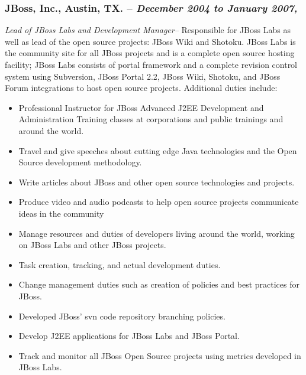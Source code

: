 \documentclass[10pt]{report}
\begin{document}
\subsubsection*{JBoss, Inc., Austin, TX. -- \emph{December 2004 to January 2007,
}} \emph{Lead of JBoss Labs and Development Manager--} Responsible for JBoss
Labs as well as lead of the open source projects: JBoss Wiki and Shotoku.  JBoss
Labs is the community site for all JBoss projects and is a complete open source
hosting facility;  JBoss Labs consists of portal framework and a complete
revision control system using Subversion, JBoss Portal 2.2, JBoss Wiki, Shotoku,
and JBoss Forum integrations to host open source projects.  Additional duties
include:

\begin{itemize}

	\item Professional Instructor for JBoss Advanced J2EE Development and
	Administration Training classes at corporations and public trainings and
	around the world.

	\item Travel and give speeches about cutting edge Java technologies and the
	Open Source development methodology.

	\item Write articles about JBoss and other open source technologies and
	projects.

	\item Produce video and audio podcasts to help open source projects
	communicate ideas in the community

	\item Manage resources and duties of developers living around the world,
	working on JBoss Labs and other JBoss projects.

	\item Task creation, tracking, and actual development duties.

	\item Change management duties such as creation of policies and best practices
	for JBoss.

	\item Developed JBoss' svn code repository branching policies.

	\item Develop J2EE applications for JBoss Labs and JBoss Portal.

	\item Track and monitor all JBoss Open Source projects using metrics developed
	in JBoss Labs.

\end{itemize}
\end{document}
